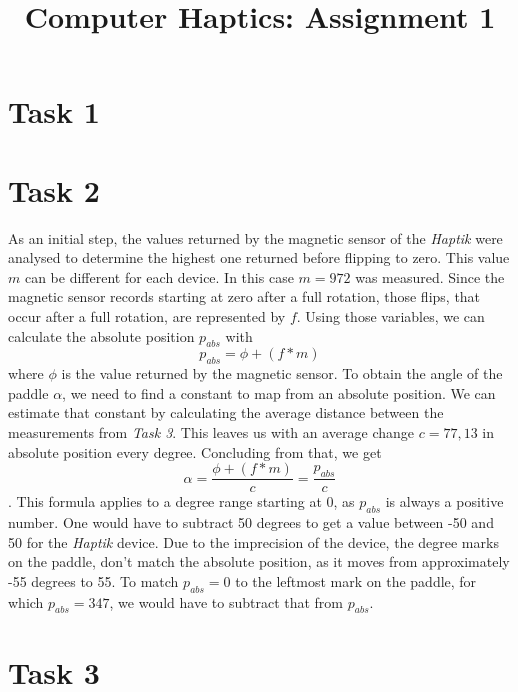 



  \title{Computer Haptics: Assignment 1}
  \maketitle

  \section*{Task 1}

  \section*{Task 2}

  As an initial step, the values returned by the magnetic sensor of the \textit{Haptik} were analysed to determine the highest one returned before flipping to zero. This value $m$ can be different for each device. In this case $m = 972$ was measured. Since the magnetic sensor records starting at zero after a full rotation, those flips, that occur after a full rotation, are represented by $f$. Using those variables, we can calculate the absolute position $p_{abs}$ with
  \begin{equation*}
    p_{abs} = \phi + (f * m)
  \end{equation*}
  where $\phi$ is the value returned by the magnetic sensor.
  To obtain the angle of the paddle $\alpha$, we need to find a constant to map from an absolute position. We can estimate that constant by calculating the average distance between the measurements from \textit{Task 3}. This leaves us with an average change $c = 77,13$ in absolute position every degree. Concluding from that, we get
  \begin{equation*}
    \alpha = \frac{\phi + (f * m)}{c} = \frac{p_{abs}}{c}
  \end{equation*}.
  This formula applies to a degree range starting at 0, as $p_{abs}$ is always a positive number. One would have to subtract 50 degrees to get a value between -50 and 50 for the \textit{Haptik} device. Due to the imprecision of the device, the degree marks on the paddle, don't match the absolute position, as it moves from approximately -55 degrees to 55. To match $p_{abs} = 0$ to the leftmost mark on the paddle, for which $p_{abs} = 347$, we would have to subtract that from $p_{abs}$.

  \section*{Task 3}

